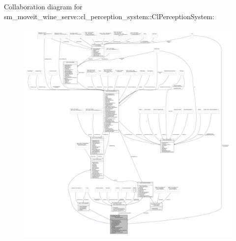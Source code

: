 Collaboration diagram for sm\+\_\+moveit\+\_\+wine\+\_\+serve\+:\+:cl\+\_\+perception\+\_\+system\+:\+:Cl\+Perception\+System\+:
\nopagebreak
\begin{figure}[H]
\begin{center}
\leavevmode
\includegraphics[width=350pt]{classsm__moveit__wine__serve_1_1cl__perception__system_1_1ClPerceptionSystem__coll__graph}
\end{center}
\end{figure}
